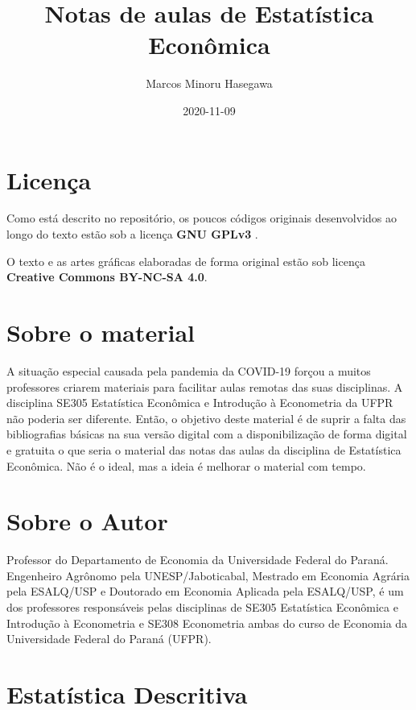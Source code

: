 \documentclass[
]{book}
\title{Notas de aulas de Estatística Econômica}
\author{Marcos Minoru Hasegawa}
\date{2020-11-09}
\begin{document}
\maketitle

{
\setcounter{tocdepth}{1}
\tableofcontents
}
\hypertarget{licenuxe7a}{%
\chapter*{Licença}\label{licenuxe7a}}

Como está descrito no repositório, os poucos códigos originais desenvolvidos ao longo do texto estão sob a licença \textbf{GNU GPLv3} .

O texto e as artes gráficas elaboradas de forma original estão sob licença \textbf{Creative Commons BY-NC-SA 4.0}.

\hypertarget{sobre-o-material}{%
\chapter*{Sobre o material}\label{sobre-o-material}}

A situação especial causada pela pandemia da COVID-19 forçou a muitos professores criarem materiais para facilitar aulas remotas das suas disciplinas. A disciplina SE305 Estatística Econômica e Introdução à Econometria da UFPR não poderia ser diferente. Então, o objetivo deste material é de suprir a falta das bibliografias básicas na sua versão digital com a disponibilização de forma digital e gratuita o que seria o material das notas das aulas da disciplina de Estatística Econômica. Não é o ideal, mas a ideia é melhorar o material com tempo.

\hypertarget{sobre-o-autor}{%
\chapter*{Sobre o Autor}\label{sobre-o-autor}}

Professor do Departamento de Economia da Universidade Federal do Paraná. Engenheiro Agrônomo pela UNESP/Jaboticabal, Mestrado em Economia Agrária pela ESALQ/USP e Doutorado em Economia Aplicada pela ESALQ/USP, é um dos professores responsáveis pelas disciplinas de SE305 Estatística Econômica e Introdução à Econometria e SE308 Econometria ambas do curso de Economia da Universidade Federal do Paraná (UFPR).

\hypertarget{estatuxedstica-descritiva}{%
\chapter{Estatística Descritiva}\label{estatuxedstica-descritiva}}
\end{document}
